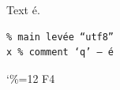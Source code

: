 \documentclass{article}
\begin{document}
Text é.
\begin{verbatim}
% main levée “utf8”
x % comment ‘q’ — é
\end{verbatim}
{\catcode`\%=12 F4 %
}
\end{document}
